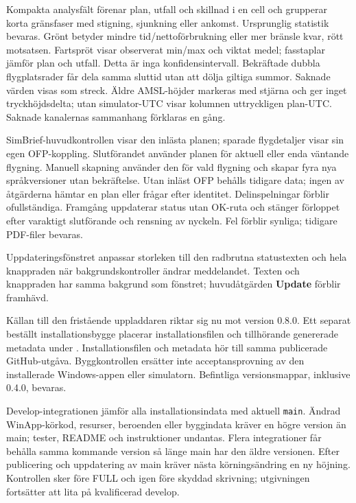 \documentclass[11pt,a4paper]{article}
\newcommand{\filepath}[1]{\path{#1}}
\newcommand{\ui}[1]{\textbf{#1}}
\begin{document}
Kompakta analysfält förenar plan, utfall och skillnad i en cell och grupperar
korta gränsfaser med stigning, sjunkning eller ankomst. Ursprunglig statistik
bevaras. Grönt betyder mindre tid/nettoförbrukning eller mer bränsle kvar,
rött motsatsen. Fartspröt visar observerat min/max och viktat medel; fasstaplar
jämför plan och utfall. Detta är inga konfidensintervall. Bekräftade dubbla
flygplatsrader får dela samma sluttid utan att dölja giltiga summor. Saknade
värden visas som streck. Äldre AMSL-höjder markeras med stjärna och ger inget
tryckhöjdsdelta; utan simulator-UTC visar kolumnen uttryckligen plan-UTC.
Saknade kanalernas sammanhang förklaras en gång.

SimBrief-huvudkontrollen visar den inlästa planen; sparade flygdetaljer visar
sin egen OFP-koppling. Slutförandet använder planen för aktuell eller enda
väntande flygning. Manuell skapning använder den för vald flygning och skapar
fyra nya språkversioner utan bekräftelse. Utan inläst OFP behålls tidigare data;
ingen av åtgärderna hämtar en plan eller frågar efter identitet. Delinspelningar
förblir ofullständiga. Framgång uppdaterar status utan OK-ruta och stänger
förloppet efter varaktigt slutförande och rensning av nyckeln. Fel förblir
synliga; tidigare PDF-filer bevaras.

Uppdateringsfönstret anpassar storleken till den radbrutna statustexten och hela
knappraden när bakgrundskontroller ändrar meddelandet. Texten och knappraden har
samma bakgrund som fönstret; huvudåtgärden \ui{Update} förblir framhävd.

Källan till den fristående uppladdaren riktar sig nu mot version 0.8.0. Ett
separat beställt installationsbygge placerar installationsfilen och tillhörande
genererade metadata \filepath{winapp-update.json} under
\filepath{winapp/dist/0.8.0/}. Installationsfilen och metadata hör till samma
publicerade GitHub-utgåva. Byggkontrollen ersätter inte acceptansprovning av den
installerade Windows-appen eller simulatorn. Befintliga versionsmappar,
inklusive
0.4.0, bevaras.

Develop-integrationen jämför alla installationsindata med aktuell
\texttt{main}. Ändrad WinApp-körkod, resurser, beroenden eller byggindata kräver
en högre version än main; tester, README och instruktioner undantas.
Flera integrationer får behålla samma kommande version så länge main har den
äldre versionen. Efter publicering och uppdatering av main kräver nästa
körningsändring en ny höjning. Kontrollen sker före FULL och igen före skyddad
skrivning; utgivningen fortsätter att lita på kvalificerad develop.
\end{document}
